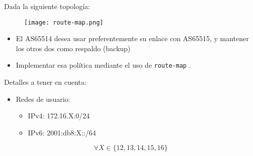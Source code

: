 Dada la siguiente topología:
  \begin{figure}[h]
    \texttt{[image: route-map.png]}
  \end{figure}

  \begin{itemize}
    \item El AS65514 desea usar preferentemente su enlace con AS65515,
    y mantener los otros dos como respaldo (backup)
    \item Implementar esa política mediante el uso de \texttt{route-map} .
  \end{itemize}

  Detalles a tener en cuenta:

  \begin{itemize}
    \item Redes de usuario:
    \begin{itemize}
      \item IPv4: 172.16.X.0/24
      \item IPv6: 2001:db8:X::/64
    \end{itemize}
  \end{itemize}

  \[ \forall X \in \{12,13,14,15,16\} \]